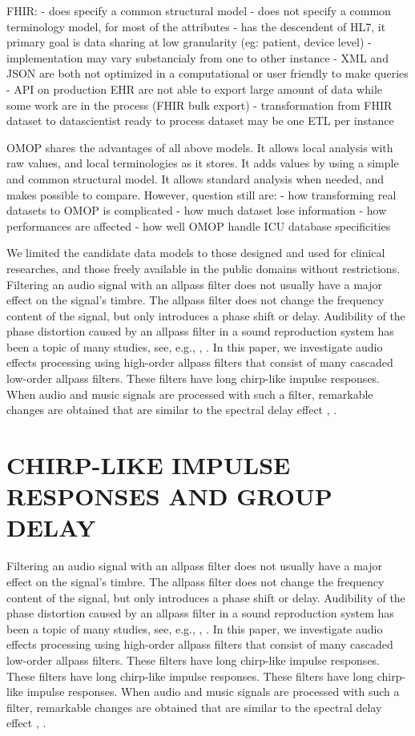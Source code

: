 \documentclass{aes2e}
\begin{document}
FHIR:
- does specify a common structural model
- does not specify a common terminology model, for most of the attributes
- has the descendent of HL7, it primary goal is data sharing at low granularity
  (eg: patient, device level)
- implementation may vary substancialy from one to other instance
- XML and JSON are both not optimized in a computational or user friendly to
  make queries
- API on production EHR are not able to export large amount of data while some
  work are in the process (FHIR bulk export)
- transformation from FHIR dataset to datascientist ready to process dataset
  may be one ETL per instance

OMOP shares the advantages of all above models. It allows local analysis with
raw values, and local terminologies as it stores. It adds values by using a
simple and common structural model. It allows standard analysis when needed,
and makes possible to compare. However, question still are:
- how transforming real datasets to OMOP is complicated
- how much dataset lose information
- how performances are affected 
- how well OMOP handle ICU database specificities

We limited the candidate data models to those designed and used for clinical
researches, and those freely available in the public domains without
restrictions.
Filtering an audio signal with an allpass filter does not usually have a major effect on the signal's timbre. The allpass filter does not change the frequency content of the signal, but only introduces a phase shift or delay. Audibility of the phase distortion caused by an allpass filter in a sound reproduction system has been a topic of many studies, see, e.g., \cite{DEK1}, \cite{DEK2}. In this paper, we investigate audio effects processing using high-order allpass filters that consist of many cascaded low-order allpass filters. These filters have long chirp-like impulse responses. When audio and music signals are processed with such a filter, remarkable changes are obtained that are similar to the spectral delay effect  \cite{DEK3}, \cite{DEK4}.

\section{CHIRP-LIKE IMPULSE RESPONSES AND GROUP DELAY}
Filtering an audio signal with an allpass filter does not usually have a major effect on the signal's timbre. The allpass filter does not change the frequency content of the signal, but only introduces a phase shift or delay. Audibility of the phase distortion caused by an allpass filter in a sound reproduction system has been a topic of many studies, see, e.g., \cite{DEK1}, \cite{DEK2}. In this paper, we investigate audio effects processing using high-order allpass filters that consist of many cascaded low-order allpass filters. These filters have long chirp-like impulse responses.  These filters have long chirp-like impulse responses.  These filters have long chirp-like impulse responses. When audio and music signals are processed with such a filter, remarkable changes are obtained that are similar to the spectral delay effect  \cite{DEK3}, \cite{DEK4}.
\end{document}
